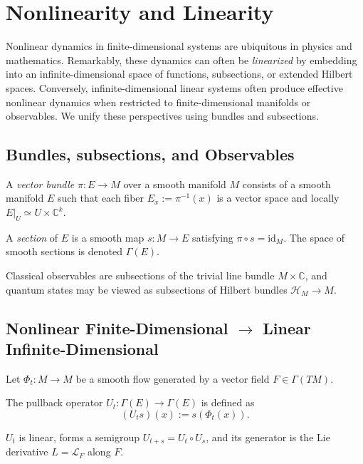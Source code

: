 \section{Nonlinearity and Linearity}

Nonlinear dynamics in finite-dimensional systems are ubiquitous in physics and
mathematics. Remarkably, these dynamics can often be \emph{linearized} by
embedding into an infinite-dimensional space of functions, subsections, or
extended Hilbert spaces. Conversely, infinite-dimensional linear systems often
produce effective nonlinear dynamics when restricted to finite-dimensional
manifolds or observables. We unify these perspectives using bundles and
subsections.

\subsection{Bundles, subsections, and Observables}

\begin{definition}
A \emph{vector bundle} $\pi: E \to M$ over a smooth manifold $M$ consists of a smooth manifold $E$ such that each fiber $E_x := \pi^{-1}(x)$ is a vector space and locally $E|_U \simeq U \times \mathbb{C}^k$.
\end{definition}

\begin{definition}[section]
A \emph{section} of $E$ is a smooth map $s: M \to E$ satisfying $\pi \circ s = \mathrm{id}_M$. The space of smooth sections is denoted $\Gamma(E)$.
\end{definition}

Classical observables are subsections of the trivial line bundle $M \times
\mathbb{C}$, and quantum states may be viewed as subsections of Hilbert bundles
$\mathcal{H}_M \to M$.

\subsection{Nonlinear Finite-Dimensional $\to$ Linear Infinite-Dimensional}

Let $\Phi_t: M \to M$ be a smooth flow generated by a vector field $F \in \Gamma(TM)$.

\begin{definition}
The pullback operator $U_t: \Gamma(E) \to \Gamma(E)$ is defined as
\[
(U_t s)(x) := s(\Phi_t(x)).
\]
\end{definition}

\begin{theorem}
$U_t$ is linear, forms a semigroup $U_{t+s} = U_t \circ U_s$, and its generator
    is the Lie derivative $L = \mathcal{L}_F$ along $F$.
\end{theorem}

